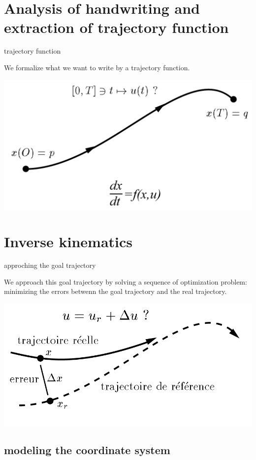 \documentclass{beamer}
\begin{document}
\section{Analysis of handwriting and extraction of trajectory function}
\begin{frame}{trajectory function}

We formalize what we want to write by a trajectory function.
\bigskip

\includegraphics[scale = 0.3]{planning.jpg}\cite{2}
\end{frame}
\section{Inverse kinematics}


\begin{frame}{approching the goal trajectory}

We approach this goal trajectory by solving a sequence of optimization problem: minimizing the errors betwenn the goal trajectory and the real trajectory.
\medskip

\includegraphics[scale = 0.4]{tracking.jpg}\cite{2}
\end{frame}

\subsection{modeling the coordinate system}
\end{document}
